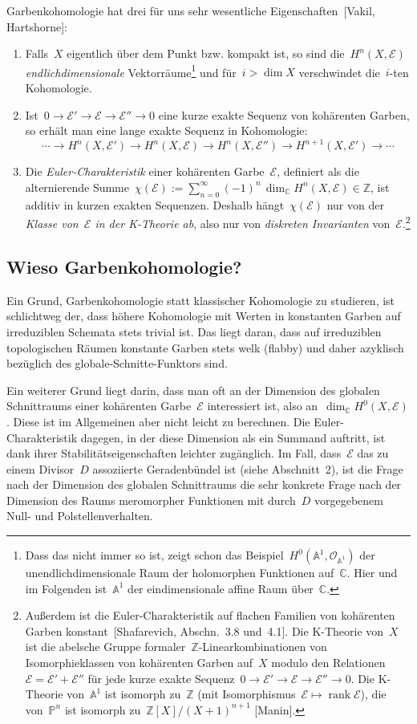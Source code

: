 \documentclass[a4paper,ngerman,12pt]{scrartcl}
\theoremstyle{definition}
\theoremstyle{plain}
\theoremstyle{remark}
\renewcommand{\AA}{\mathbb{A}}
\newcommand{\CC}{\mathbb{C}}
\newcommand{\ZZ}{\mathbb{Z}}
\newcommand{\PP}{\mathbb{P}}
\newcommand{\E}{\mathcal{E}}
\renewcommand{\O}{\mathcal{O}}
\newcommand{\rank}{\operatorname{rank}}
\newcommand{\lra}{\longrightarrow}
\begin{document}
Garbenkohomologie hat drei für uns sehr wesentliche Eigenschaften~[Vakil,
Hartshorne]:
\begin{enumerate}
\item Falls~$X$ eigentlich über dem Punkt bzw. kompakt ist, so sind
die~$H^n(X,\E)$ \emph{endlichdimensionale} Vektorräume\footnote{Dass das
nicht immer so ist, zeigt schon das Beispiel~$H^0(\AA^1, \O_{\AA^1})$ der
unendlichdimensionale Raum der holomorphen Funktionen auf~$\CC$. Hier und im
Folgenden ist~$\AA^1$ der eindimensionale affine Raum über~$\CC$.} und für~$i > \dim X$
verschwindet die~$i$-ten Kohomologie.
\item Ist~$0 \to \E' \to \E \to \E'' \to 0$ eine kurze exakte Sequenz von
kohärenten Garben, so erhält man eine lange exakte Sequenz in Kohomologie:
\[ \cdots \lra H^n(X,\E') \lra H^n(X,\E) \lra H^n(X,\E'') \lra H^{n+1}(X,\E')
\lra \cdots \]
\item Die \emph{Euler-Charakteristik} einer kohärenten Garbe~$\E$, definiert
als die alternierende Summe~$\chi(\E) := \sum_{n=0}^\infty (-1)^n\, \dim_\CC H^n(X,\E)
\in \ZZ$, ist additiv in kurzen exakten Sequenzen. Deshalb hängt~$\chi(\E)$ nur
von der \emph{Klasse von~$\E$ in der K-Theorie ab}, also nur von
\emph{diskreten Invarianten} von~$\E$.\footnote{Außerdem ist die
Euler-Charakteristik auf flachen Familien von kohärenten Garben
konstant~[Shafarevich, Abschn.~3.8 und~4.1].
Die K-Theorie von~$X$ ist die abelsche Gruppe
formaler~$\ZZ$-Linearkombinationen von Isomorphieklassen von kohärenten Garben
auf~$X$ modulo den Relationen~$\E = \E' + \E''$ für jede kurze exakte
Sequenz~$0 \to \E' \to \E \to \E'' \to 0$.  Die K-Theorie von~$\AA^1$ ist
isomorph zu~$\ZZ$ (mit Isomorphismus~$\E \mapsto \rank\E$), die von~$\PP^n$ ist
isomorph zu~$\ZZ[X]/(X+1)^{n+1}$ [Manin].}
\end{enumerate}


\subsection*{Wieso Garbenkohomologie?}

Ein Grund, Garbenkohomologie statt klassischer Kohomologie zu studieren, ist
schlichtweg der, dass höhere Kohomologie mit Werten in konstanten Garben auf
irreduziblen Schemata stets trivial ist. Das liegt daran, dass auf irreduziblen
topologischen Räumen konstante Garben stets welk (flabby) und daher azyklisch
bezüglich des globale-Schnitte-Funktors sind.

Ein weiterer Grund liegt darin, dass man oft an der Dimension des globalen
Schnitt\-raums einer kohärenten Garbe~$\E$ interessiert ist, also an~$\dim_\CC
H^0(X,\E)$. Diese ist im Allgemeinen aber nicht leicht zu berechnen. Die
Euler-Charakteristik dagegen, in der diese Dimension als ein Summand auftritt,
ist dank ihrer Stabilitätseigenschaften leichter zugänglich. Im Fall, dass~$\E$
das zu einem Divisor~$D$ assoziierte Geradenbündel ist (siehe Abschnitt~2), ist
die Frage nach der Dimension des globalen Schnittraums die sehr konkrete Frage
nach der Dimension des Raums meromorpher Funktionen mit durch~$D$ vorgegebenem
Null- und Polstellenverhalten.
\end{document}
